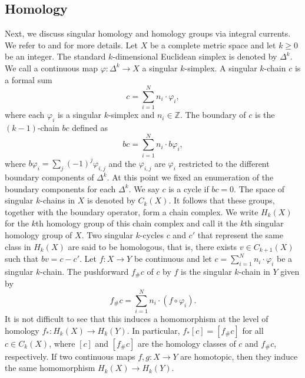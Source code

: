 \documentclass{amsart}
\numberwithin{equation}{section}
\newcommand{\Z}{\mathbb{Z}}
\begin{document}
    \subsection{Homology}\label{sec: homology}
        Next, we discuss singular homology and homology groups via integral currents. We refer to \cite{Hatcher} and \cite{Mitsuishi} for more details. Let $X$ be a complete metric space and let $k\geq0$ be an integer. The standard $k$-dimensional Euclidean simplex is denoted by $\Delta^k$. We call a continuous map $\varphi \colon \Delta^k \to X$ a singular $k$-simplex. A singular $k$-chain $c$ is a formal sum
        $$c = \sum_{i=1}^N n_i \cdot \varphi_i,$$
        where each $\varphi_i$ is a singular $k$-simplex and $n_i \in \Z$. The boundary of $c$ is the $(k-1)$-chain $bc$ defined as
        $$bc = \sum_{i=1}^N n_i \cdot b\varphi_i,$$
        where $b\varphi_i = \sum_j (-1)^j \varphi_{i,j}$ and the $\varphi_{i,j}$ are $\varphi_i$ restricted to the different boundary components of $\Delta^k$. At this point we fixed an enumeration of the boundary components for each $\Delta^k$. We say $c$ is a cycle if $bc = 0$. The space of singular $k$-chains in $X$ is denoted by $C_k(X)$. It follows that these groups, together with the boundary operator, form a chain complex. We write $H_k(X)$ for the $k$th homology group of this chain complex and call it the $k$th singular homology group of $X$. Two singular $k$-cycles $c$ and $c'$ that represent the same class in $H_k(X)$ are said to be homologous, that is, there exists $v\in C_{k+1}(X)$ such that $bv= c-c'$. Let $f\colon X \to Y$ be continuous and let $c= \sum_{i=1}^N n_i \cdot \varphi_i$ be a singular $k$-chain. The pushforward $f_\#c$ of $c$ by $f$ is the singular $k$-chain in $Y$ given by 
        $$f_\#c = \sum_{i=1}^N n_i \cdot (f\circ \varphi_i).$$
        It is not difficult to see that this induces a homomorphism at the level of homology $f_*\colon H_k(X) \to H_k(Y)$. In particular, $f_*[c] = [f_\#c]$ for all $c\in C_k(X)$, where $[c]$ and $ [f_\#c]$ are the homology classes of $c$ and $f_\#c$, respectively. If two continuous maps $f,g \colon X\to Y$ are homotopic, then they induce the same homomorphism $H_k(X)\to H_k(Y)$. 
        
        \medskip
\end{document}
